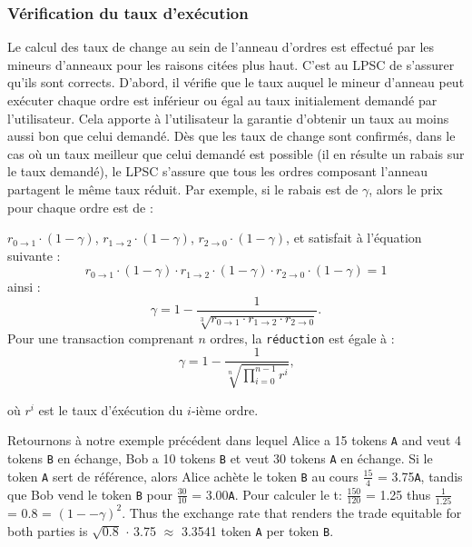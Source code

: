 \documentclass[UTF8,nofonts]{article}
\begin{document}
\begin{multicols}{2}
\subsubsection{Vérification du taux d'exécution\label{sec:fill_rate_check}}

Le calcul des taux de change au sein de l'anneau d'ordres est effectué par les mineurs d'anneaux pour les raisons citées plus haut. C'est au LPSC de s'assurer qu'ils sont corrects. D'abord, il vérifie que le taux auquel le mineur d'anneau peut exécuter chaque ordre est inférieur ou égal au taux initialement demandé par l'utilisateur. Cela apporte à l'utilisateur la garantie d'obtenir un taux au moins aussi bon que celui demandé. Dès que les taux de change sont confirmés, dans le cas où un taux meilleur que celui demandé est possible (il en résulte un rabais sur le taux demandé), le LPSC s'assure que tous les ordres composant l'anneau partagent le même taux réduit. Par exemple, si le rabais est de $\gamma$, alors le prix pour chaque ordre est de :

$r_{0\rightarrow 1} \cdot (1-\gamma)$, $r_{1\rightarrow 2} \cdot (1-\gamma)$, $r_{2 \rightarrow 0} \cdot (1-\gamma)$, et satisfait à l'équation suivante : 
\begin{equation}
r_{0\rightarrow 1} \cdot (1-\gamma)\cdot r_{1\rightarrow 2} \cdot (1-\gamma) \cdot r_{2 \rightarrow 0} \cdot (1-\gamma) = 1
\end{equation}
ainsi : 
\begin{equation}
\gamma = 1- \frac{1}{\sqrt[3]{r_{0\rightarrow 1} \cdot r_{1\rightarrow 2} \cdot r_{2\rightarrow 0}}}\text{.}
\end{equation}
Pour une transaction comprenant $n$ ordres, la \texttt{réduction} est égale à : 
\begin{equation}
\gamma = 1- \frac{1}{\sqrt[n]{\prod_{i=0}^{n-1} r^i}} \text{,}
\end{equation}

où $r^i$ est le taux d'éxécution du $i$-ième ordre.

Retournons à notre exemple précédent dans lequel Alice a 15 tokens \verb|A| and veut 4 tokens \verb|B| en échange, Bob a 10 tokens \verb|B| et veut 30 tokens \verb|A| en échange. Si le token \verb|A| sert de référence, alors Alice achète le token \verb|B| au cours $\frac{15}{4}$ = 3.75\verb|A|, tandis que Bob vend le token \verb|B| pour $\frac{30}{10}$ = 3.00\verb|A|. Pour calculer le t: $\frac{150}{120}$ = 1.25 thus $\frac{1}{1.25}$ = 0.8 = $(1 −- \gamma)^2$. Thus the exchange rate that renders the trade equitable for both parties is $\sqrt{0.8}$ $\cdot$ 3.75 $\approx$ 3.3541 token \verb|A| per token \verb|B|.


\end{multicols}
\end{document}
